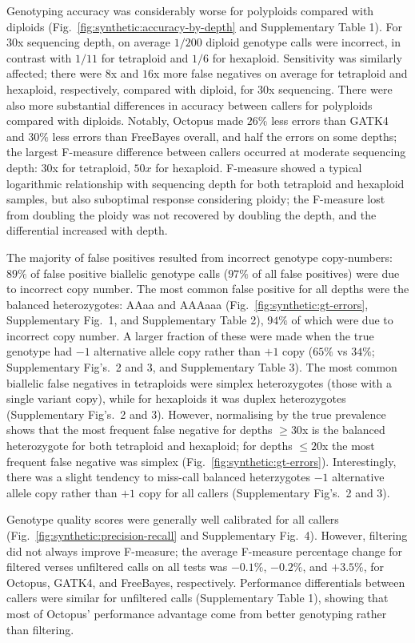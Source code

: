 \documentclass[notitlepage, twocolumn, 10pt]{article}
\begin{document}
Genotyping accuracy was considerably worse for polyploids compared with diploids (Fig.\ \ref{fig:synthetic:accuracy-by-depth} and Supplementary Table 1). For $30$x sequencing depth, on average $1/200$ diploid genotype calls were incorrect, in contrast with $1/11$ for tetraploid and $1/6$ for hexaploid. Sensitivity was similarly affected; there were $8$x and $16$x more false negatives on average for tetraploid and hexaploid, respectively, compared with diploid, for $30$x sequencing. There were also more substantial differences in accuracy between callers for polyploids compared with diploids. Notably, Octopus made $26\%$ less errors than GATK4 and $30\%$ less errors than FreeBayes overall, and half the errors on some depths; the largest F-measure difference between callers occurred at moderate sequencing depth: $30$x for tetraploid, $50x$ for hexaploid. F-measure showed a typical logarithmic relationship with sequencing depth for both tetraploid and hexaploid samples, but also suboptimal response considering ploidy; the F-measure lost from doubling the ploidy was not recovered by doubling the depth, and the differential increased with depth.

The majority of false positives resulted from incorrect genotype copy-numbers: $89\%$ of false positive biallelic genotype calls ($97\%$ of all false positives) were due to incorrect copy number. The most common false positive for all depths were the balanced heterozygotes: AAaa and AAAaaa (Fig.\ \ref{fig:synthetic:gt-errors}, Supplementary Fig.\ 1, and Supplementary Table 2), $94\%$ of which were due to incorrect copy number. A larger fraction of these were made when the true genotype had $-1$ alternative allele copy rather than $+1$ copy ($65\%$ vs $34\%$; Supplementary Fig's.\ 2 and $3$, and Supplementary Table 3). The most common biallelic false negatives in tetraploids were simplex heterozygotes (those with a single variant copy), while for hexaploids it was duplex heterozygotes (Supplementary Fig's.\ 2 and 3). However, normalising by the true prevalence shows that the most frequent false negative for depths $\ge 30$x is the balanced heterozygote for both tetraploid and hexaploid; for depths $\le 20$x the most frequent false negative was simplex (Fig.\ \ref{fig:synthetic:gt-errors}). Interestingly, there was a slight tendency to miss-call balanced heterzygotes $-1$ alternative allele copy rather than $+1$ copy for all callers (Supplementary Fig's.\ 2 and 3).

Genotype quality scores were generally well calibrated for all callers (Fig.\ \ref{fig:synthetic:precision-recall} and Supplementary Fig.\ 4). However, filtering did not always improve F-measure; the average F-measure percentage change for filtered verses unfiltered calls on all tests was $-0.1\%$, $-0.2\%$, and $+3.5\%$, for Octopus, GATK4, and FreeBayes, respectively. Performance differentials between callers were similar for unfiltered calls (Supplementary Table 1), showing that most of Octopus' performance advantage come from better genotyping rather than filtering.
\end{document}

